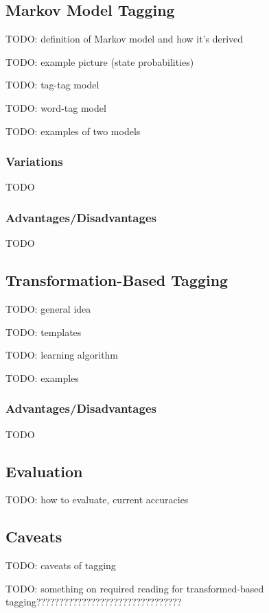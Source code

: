 \documentclass{article}
\begin{document}
\subsection{Markov Model Tagging}

TODO: definition of Markov model and how it's derived

TODO: example picture (state probabilities)

TODO: tag-tag model

TODO: word-tag model

TODO: examples of two models

\subsubsection{Variations}

TODO

\subsubsection{Advantages/Disadvantages}

TODO

\subsection{Transformation-Based Tagging}

TODO: general idea

TODO: templates

TODO: learning algorithm

TODO: examples

\subsubsection{Advantages/Disadvantages}

TODO

\subsection{Evaluation}

TODO: how to evaluate, current accuracies

\subsection{Caveats}

TODO: caveats of tagging


TODO: something on required reading for transformed-based tagging????????????????????????????????
\end{document}
